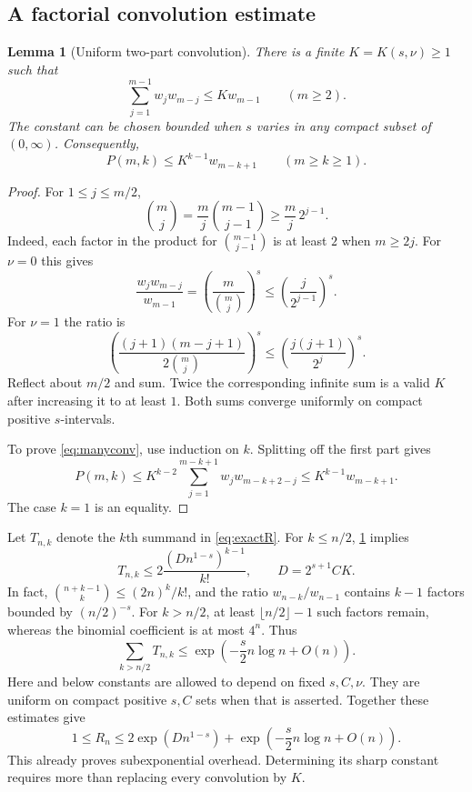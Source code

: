 \documentclass[11pt,a4paper]{article}
\newtheorem{lemma}[theorem]{Lemma}
\theoremstyle{definition}
\theoremstyle{remark}
\numberwithin{equation}{section}
\begin{document}
\subsection{A factorial convolution estimate}
\begin{lemma}[Uniform two-part convolution]\label{lem:twoconv}
There is a finite $K=K(s,\nu)\ge1$ such that
\begin{equation}
 \sum_{j=1}^{m-1} w_jw_{m-j}\le K w_{m-1}\qquad(m\ge2).
 \label{eq:twoconv}
\end{equation}
The constant can be chosen bounded when $s$ varies in any compact subset
of $(0,\infty)$. Consequently,
\begin{equation}
 P(m,k)\le K^{k-1}w_{m-k+1}\qquad(m\ge k\ge1).
 \label{eq:manyconv}
\end{equation}
\end{lemma}
\begin{proof}
For $1\le j\le m/2$,
\[
 \binom mj=\frac mj\binom{m-1}{j-1}\ge\frac mj\,2^{j-1}.
\]
Indeed, each factor in the product for $\binom{m-1}{j-1}$ is at least
$2$ when $m\ge2j$. For $\nu=0$ this gives
\[
 \frac{w_jw_{m-j}}{w_{m-1}}
 =\left(\frac m{\binom mj}\right)^s
 \le\left(\frac j{2^{j-1}}\right)^s.
\]
For $\nu=1$ the ratio is
\[
 \left(\frac{(j+1)(m-j+1)}{2\binom mj}\right)^s
 \le\left(\frac{j(j+1)}{2^j}\right)^s.
\]
Reflect about $m/2$ and sum. Twice the corresponding infinite sum is a
valid $K$ after increasing it to at least $1$. Both sums converge
uniformly on compact positive $s$-intervals.

To prove \eqref{eq:manyconv}, use induction on $k$. Splitting off the
first part gives
\[
 P(m,k)\le K^{k-2}\sum_{j=1}^{m-k+1}w_jw_{m-k+2-j}
 \le K^{k-1}w_{m-k+1}.
\]
The case $k=1$ is an equality.
\end{proof}

Let $T_{n,k}$ denote the $k$th summand in \eqref{eq:exactR}. For
$k\le n/2$, \cref{lem:twoconv} implies
\begin{equation}
 T_{n,k}\le
 2\frac{(D n^{1-s})^{k-1}}{k!},\qquad
 D=2^{s+1}CK.
 \label{eq:poissontailbound}
\end{equation}
In fact, $\binom{n+k-1}{k}\le(2n)^k/k!$, and the ratio
$w_{n-k}/w_{n-1}$ contains $k-1$ factors bounded by $(n/2)^{-s}$.
For $k>n/2$, at least $\lfloor n/2\rfloor-1$ such factors remain,
whereas the binomial coefficient is at most $4^n$. Thus
\begin{equation}
 \sum_{k>n/2}T_{n,k}
 \le\exp\left(-\frac{s}{2}n\log n+O(n)\right).
 \label{eq:longtail}
\end{equation}
Here and below constants are allowed to depend on fixed $s,C,\nu$.
They are uniform on compact positive $s,C$ sets when that is asserted.
Together these estimates give
\begin{equation}
 1\le R_n\le 2\exp(D n^{1-s})+
            \exp\left(-\frac{s}{2}n\log n+O(n)\right).
 \label{eq:coarsecost}
\end{equation}
This already proves subexponential overhead. Determining its sharp
constant requires more than replacing every convolution by $K$.
\end{document}
